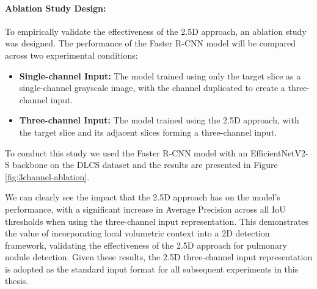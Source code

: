 \paragraph{Ablation Study Design:}
To empirically validate the effectiveness of the 2.5D approach, an ablation study was designed. The performance of the Faster R-CNN model will be compared across two experimental conditions:
\begin{itemize}
    \item \textbf{Single-channel Input:} The model trained using only the target slice as a single-channel grayscale image, with the channel duplicated to create a three-channel input.
    \item \textbf{Three-channel Input:} The model trained using the 2.5D approach, with the target slice and its adjacent slices forming a three-channel input. 
\end{itemize}
To conduct this study we used the Faster R-CNN model with an EfficientNetV2-S backbone on the DLCS dataset and the results are presented in Figure \ref{fig:3channel-ablation}.



We can clearly see the impact that the 2.5D approach has on the model's performance, with a significant increase in Average Precision across all IoU thresholds when using the three-channel input representation. This demonstrates the value of incorporating local volumetric context into a 2D detection framework, validating the effectiveness of the 2.5D approach for pulmonary nodule detection. Given these results, the 2.5D three-channel input representation is adopted as the standard input format for all subsequent experiments in this thesis.

